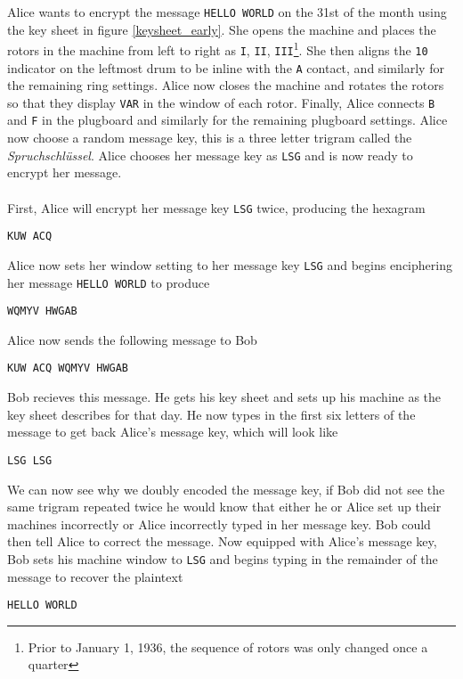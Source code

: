 \noindent Alice wants to encrypt the message \texttt{HELLO WORLD} on
the 31st of the month using the key sheet in figure
\ref{keysheet_early}. She opens the machine and places the rotors in
the machine from left to right as \texttt{I}, \texttt{II},
\texttt{III}\footnote{Prior to January 1, 1936, the sequence of
	rotors was only changed once a quarter}. She then aligns the
\texttt{10} indicator on the
leftmost drum to be inline with the \texttt{A} contact, and similarly
for the remaining ring settings. Alice now closes the machine and
rotates the rotors so that they display \texttt{VAR} in the window of
each rotor. Finally, Alice connects \texttt{B} and \texttt{F} in the
plugboard and similarly for the remaining plugboard settings. Alice
now choose a random message key, this is a three letter trigram
called the \emph{Spruchschlüssel}. Alice chooses her message key as
\texttt{LSG} and is now ready to encrypt her message.
\\\\First, Alice will encrypt her message key \texttt{LSG} twice,
producing the hexagram
\begin{center}
	\texttt{KUW ACQ}
\end{center}
\noindent Alice now sets her window setting to her message key
\texttt{LSG} and begins enciphering her message \texttt{HELLO WORLD} to produce
\begin{center}
	\texttt{WQMYV HWGAB}
\end{center}
Alice now sends the following message to Bob
\begin{center}
	\texttt{KUW ACQ WQMYV HWGAB}
\end{center}
\noindent Bob recieves this message. He gets his key sheet and sets
up his machine as the key sheet describes for that day. He now types
in the first six letters of the message to get back Alice's message
key, which will look like
\begin{center}
	\texttt{LSG LSG}
\end{center}
We can now see why we doubly encoded the message key, if Bob did not
see the same trigram repeated twice he would know that either he or
Alice set up their machines incorrectly or Alice incorrectly typed in
her message key. Bob could then tell Alice to correct the message.
Now equipped with Alice's message key, Bob sets his machine window to
\texttt{LSG} and begins typing in the remainder of the message to
recover the plaintext
\begin{center}
	\texttt{HELLO WORLD}
\end{center}
